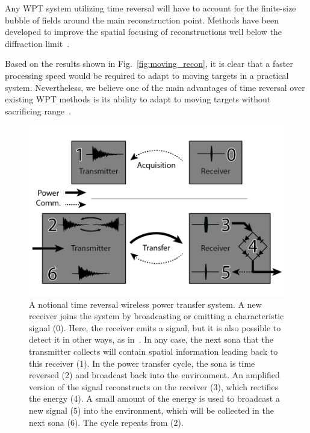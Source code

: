 Any WPT system utilizing time reversal will have to account for the
finite-size bubble of fields around the main reconstruction point.
Methods have been developed to improve the spatial focusing of reconstructions
well below the diffraction limit~\cite{lerosey-focusing}.

Based on the results shown in Fig.~\ref{fig:moving_recon}, it is clear that a faster
processing speed would be required to adapt to moving targets in a practical system.
%
Nevertheless, we believe one of the main advantages of time reversal over
existing WPT methods is its ability to adapt to moving targets without sacrificing
range~\cite{fink,nltr-wave-chaotic}.


\begin{figure}[t]
\includegraphics[width=\columnwidth]{figs/WPTSysAlt}
\caption{A notional time reversal wireless power transfer system. A new receiver joins the system by broadcasting or emitting a characteristic signal (0). Here, the receiver emits a signal, but it is also possible to detect it in other ways, as in~\cite{nltr-wave-chaotic}. In any case, the next sona that the transmitter collects will contain spatial information leading back to this receiver (1). In the power transfer cycle, the sona is time reversed (2) and broadcast back into the environment. An amplified version of the signal reconstructs on the receiver (3), which rectifies the energy (4). A small amount of the energy is used to broadcast a new signal (5) into the environment, which will be collected in the next sona (6). The cycle repeats from (2).}
\label{fig:SysImage}
\end{figure}

